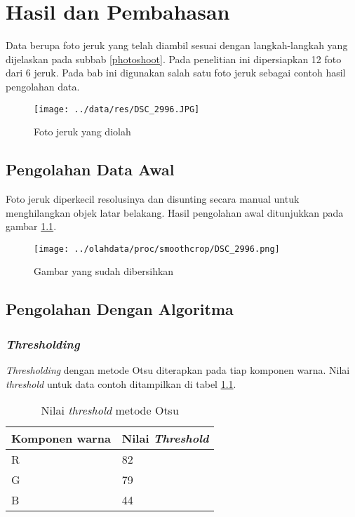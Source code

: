 \documentclass[laporan.tex]{subfiles}
\begin{document}
\chapter{Hasil dan Pembahasan}

Data berupa foto jeruk yang telah diambil sesuai dengan langkah-langkah yang dijelaskan pada subbab \ref{photoshoot}. Pada penelitian ini dipersiapkan 12 foto dari 6 jeruk. Pada bab ini digunakan salah satu foto jeruk sebagai contoh hasil pengolahan data.

\begin{figure}[h]
\centering
\texttt{[image: ../data/res/DSC\_2996.JPG]}
\caption{Foto jeruk yang diolah}
\end{figure}

\section{Pengolahan Data Awal}

Foto jeruk diperkecil resolusinya dan disunting secara manual untuk menghilangkan objek latar belakang. Hasil pengolahan awal ditunjukkan pada gambar \ref{fig:imgedited}.

\begin{figure}[h]
\centering
\texttt{[image: ../olahdata/proc/smoothcrop/DSC\_2996.png]}
\caption{Gambar yang sudah dibersihkan}
\label{fig:imgedited}
\end{figure}

\section{Pengolahan Dengan Algoritma}

\subsection{\emph{Thresholding}}

\emph{Thresholding} dengan metode Otsu diterapkan pada tiap komponen warna. Nilai \emph{threshold} untuk data contoh ditampilkan di tabel \ref{table:threshval}.

\begin{table}[h]
\centering
\begin{tabular}{|l|l|}
\hline
Komponen warna & Nilai \emph{Threshold} \\
\hline
R & 82 \\
G & 79 \\
B & 44 \\
\hline
\end{tabular}
\caption{Nilai \emph{threshold} metode Otsu}
\label{table:threshval}
\end{table}
\end{document}
